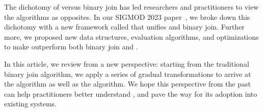 The dichotomy of \WCOJ versus binary join has led researchers
and practitioners to view the algorithms as opposites.
In our SIGMOD 2023 paper~\cite{10.1145/3589295},
we broke down this dichotomy with a new framework called \FJ
that unifies \WCOJ and binary join.
Further more, we proposed new data structures, evaluation algorithms,
and optimizations to make \FJ outperform both binary join and \WCOJ.

In this article, we review \FJ from a new perspective:
starting from the traditional binary join algorithm,
we apply a series of gradual transformations
to arrive at the \FJ algorithm as well as the \WCOJ algorithm.
We hope this perspective from the past can help practitioners
better understand \FJ,
and pave the way for its adoption into existing systems.




